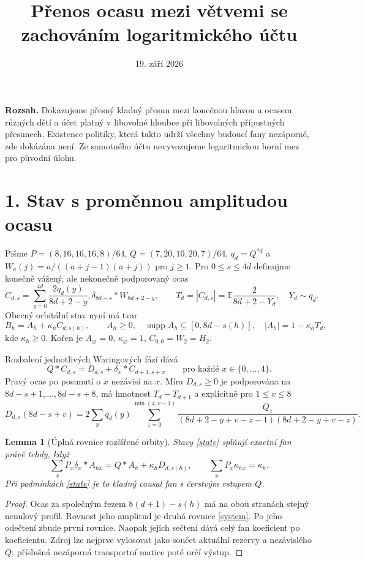 \documentclass[11pt,a4paper]{article}
\title{Přenos ocasu mezi větvemi se zachováním logaritmického účtu}
\author{}
\date{19. září 2026}
\newtheorem{lemma}[theorem]{Lemma}
\newcommand{\E}{\mathbb E}
\begin{document}
\maketitle
\noindent\textbf{Rozsah.} Dokazujeme přesný kladný přesun mezi konečnou
hlavou a ocasem různých dětí a účet platný v libovolné hloubce při
libovolných přípustných přesunech. Existence politiky, která takto udrží
všechny budoucí fany nezáporné, zde dokázána není. Ze samotného účtu
nevyvozujeme logaritmickou horní mez pro původní úlohu.

\section*{1. Stav s proměnnou amplitudou ocasu}
Pišme $P=(8,16,16,16,8)/64$, $Q=(7,20,10,20,7)/64$,
$q_d=Q^{*d}$ a $W_a(j)=a/((a+j-1)(a+j))$ pro $j\ge1$.
Pro $0\le s\le4d$ definujme konečně vážený, ale nekonečně podporovaný ocas
\[
 C_{d,s}=\sum_{y=0}^{4d}\frac{2q_d(y)}{8d+2-y},
             \delta_{8d-s}*W_{8d+2-y},\qquad
 T_d=|C_{d,s}|=\E\frac{2}{8d+2-Y_d},\quad Y_d\sim q_d.
\]
Obecný orbitální stav nyní má tvar
\begin{equation}\label{state}
 B_h=A_h+\kappa_h C_{d,s(h)},\qquad
 A_h\ge0,\quad \operatorname{supp}A_h\subseteq[0,8d-s(h)],
 \quad |A_h|=1-\kappa_hT_d,
\end{equation}
kde $\kappa_h\ge0$. Kořen je $A_\varnothing=0$, $\kappa_\varnothing=1$,
$C_{0,0}=W_2=H_2$.

Rozbalení jednotlivých Waringových fází dává
\[
 Q*C_{d,s}=D_{d,s}+\delta_x*C_{d+1,s+x}
 \qquad\text{pro každé }x\in\{0,\ldots,4\}.
\]
Pravý ocas po posunutí o $x$ nezávisí na $x$.
Míra $D_{d,s}\ge0$ je podporována na $8d-s+1,\ldots,8d-s+8$,
má hmotnost $T_d-T_{d+1}$ a explicitně pro $1\le v\le8$
\[
 D_{d,s}(8d-s+v)=
 2\sum_y q_d(y)\sum_{z=0}^{\min(4,v-1)}
 \frac{Q_z}{(8d+2-y+v-z-1)(8d+2-y+v-z)}.
\]

\begin{lemma}[Úplná rovnice rozšířené orbity]\label{fan}
Stavy \eqref{state} splňují exactní fan právě tehdy, když
\begin{equation}\label{system}
 \boxed{
 \sum_xP_x\delta_x*A_{hx}=Q*A_h+\kappa_hD_{d,s(h)},
 \qquad \sum_xP_x\kappa_{hx}=\kappa_h.}
\end{equation}
Při podmínkách \eqref{state} je to kladný causal fan s čerstvým vstupem $Q$.
\end{lemma}
\begin{proof}
Ocas za společným řezem $8(d+1)-s(h)$ má na obou stranách stejný
nenulový profil. Rovnost jeho amplitud je druhá rovnice
\eqref{system}. Po jeho odečtení zbude první rovnice. Naopak jejich
sečtení dává celý fan koeficient po koeficientu. Zdroj lze nejprve
vylosovat jako součet aktuální rezervy a nezávislého $Q$; příslušná
nezáporná transportní matice poté určí výstup.
\end{proof}
\end{document}
